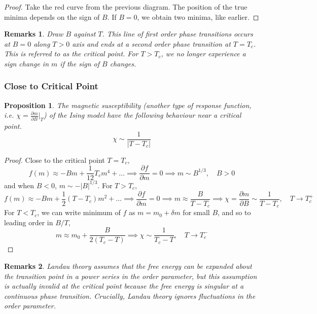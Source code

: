 \documentclass[a4paper]{article}
\newtheorem{remarks}{Remarks}[section]
\theoremstyle{new}
\newtheorem{prop}{Proposition}[section]
\begin{document}
\begin{proof}
Take the red curve from the previous diagram. The position of the true minima depends on the sign of $B$. If $B=0$, we obtain two minima, like earlier.
\end{proof}
\begin{remarks}
Draw $B$ against $T$. This line of first order phase transitions occurs at $B=0$ along $T>0$ axis and ends at a second order phase transition at $T = T_c$. This is referred to as the critical point. For $T>T_c$, we no longer experience a sign change in $m$ if the sign of $B$ changes.
\end{remarks}
\subsubsection{Close to Critical Point}
\begin{prop}
The magnetic susceptibility (another type of response function, i.e. $\chi=\frac{\partial m}{\partial B}|_T$) of the Ising model have the following behaviour near a critical point.
$$\chi\sim\frac{1}{|T-T_c|}$$
\end{prop}
\begin{proof}
Close to the critical point $T=T_c$,
$$f(m)\approx-Bm+\frac{1}{12}T_cm^4+\dots\implies \frac{\partial f}{\partial m}=0\implies m\sim B^{1/3},\quad B>0$$
and when $B<0$, $m\sim-|B|^{1/3}$. For $T>T_c$,
$$f(m)\approx-Bm+\frac{1}{2}(T-T_c)m^2+\dots\implies \frac{\partial f}{\partial m}=0\implies m\approx\frac{B}{T-T_c}\implies\chi=\frac{\partial m}{\partial B}\sim\frac{1}{T-T_c},\quad T\rightarrow T_c^+$$
For $T<T_c$, we can write minimum of $f$ as $m=m_0+\delta m$ for small $B$, and so to leading order in $B/T$, 
$$m\approx m_0+\frac{B}{2(T_c-T)}\implies\chi\sim\frac{1}{T_c-T},\quad T\rightarrow T_c^-$$
\end{proof}
\begin{remarks}
Landau theory assumes that the free energy can be expanded about the transition point in a power series in the order parameter, but this assumption is actually invalid at the critical point because the free energy is singular at a continuous phase transition. Crucially, Landau theory ignores fluctuations in the order parameter.
\end{remarks}
\newpage
\end{document}
